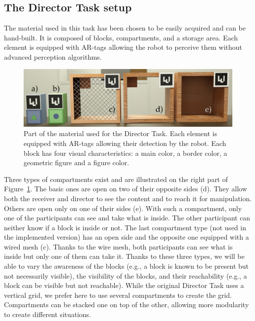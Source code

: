 \subsection{The Director Task setup}

The material used in this task has been chosen to be easily acquired and can be hand-built. It is composed of blocks, compartments, and a storage area. Each element is equipped with AR-tags allowing the robot to perceive them without advanced perception algorithms.

\begin{figure}[ht!]
\centering
\includegraphics[width=\textwidth]{figures/chapter9/material.png}
\caption{\label{fig:chap9_material} Part of the material used for the Director Task. Each element is equipped with AR-tags allowing their detection by the robot. Each block has four visual characteristics: a main color, a border color, a geometric figure  and a figure color. }
\end{figure}

Three types of compartments exist and are illustrated on the right part of Figure~\ref{fig:chap9_material}. The basic ones are open on two of their opposite sides (d). They allow both the receiver and director to see the content and to reach it for manipulation. Others are open only on one of their sides (e). With such a compartment, only one of the participants can see and take what is inside. The other participant can neither know if a block is inside or not. The last compartment type (not used in the implemented version) has an open side and the opposite one equipped with a wired mesh (c). Thanks to the wire mesh, both participants can see what is inside but only one of them can take it. Thanks to these three types, we will be able to vary the awareness of the blocks (e.g., a block is known to be present but not necessarily visible), the visibility of the blocks, and their reachability (e.g., a block can be visible but not reachable). While the original Director Task uses a vertical grid, we prefer here to use several compartments to create the grid. Compartments can be stacked one on top of the other, allowing more modularity to create different situations.

